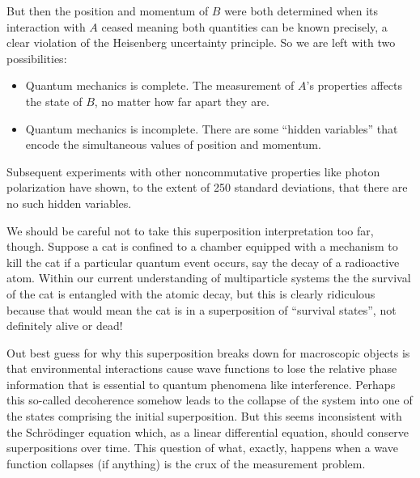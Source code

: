 \documentclass[../p052main.tex]{subfiles}
\begin{document}
But then the position and momentum of $B$ were both determined when its interaction with $A$ ceased meaning both quantities can be known precisely, a clear violation of the Heisenberg uncertainty principle.
So we are left with two possibilities:
\begin{itemize}
    \item Quantum mechanics is complete.
    The measurement of $A$'s properties affects the state of $B$, no matter how far apart they are.
    \item Quantum mechanics is incomplete.
    There are some ``hidden variables'' that encode the simultaneous values of position and momentum.
\end{itemize}
Subsequent experiments with other noncommutative properties like photon polarization have shown, to the extent of 250 standard deviations, that there are no such hidden variables.

We should be careful not to take this superposition interpretation too far, though.
Suppose a cat is confined to a chamber equipped with a mechanism to kill the cat if a particular quantum event occurs, say the decay of a radioactive atom.
Within our current understanding of multiparticle systems the the survival of the cat is entangled with the atomic decay, but this is clearly ridiculous because that would mean the cat is in a superposition of ``survival states'', not definitely alive or dead!

Out best guess for why this superposition breaks down for macroscopic objects is that environmental interactions cause wave functions to lose the relative phase information that is essential to quantum phenomena like interference.
Perhaps this so-called decoherence somehow leads to the collapse of the system into one of the states comprising the initial superposition.
But this seems inconsistent with the Schrödinger equation which, as a linear differential equation, should conserve superpositions over time.
This question of what, exactly, happens when a wave function collapses (if anything) is the crux of the measurement problem.
\end{document}
